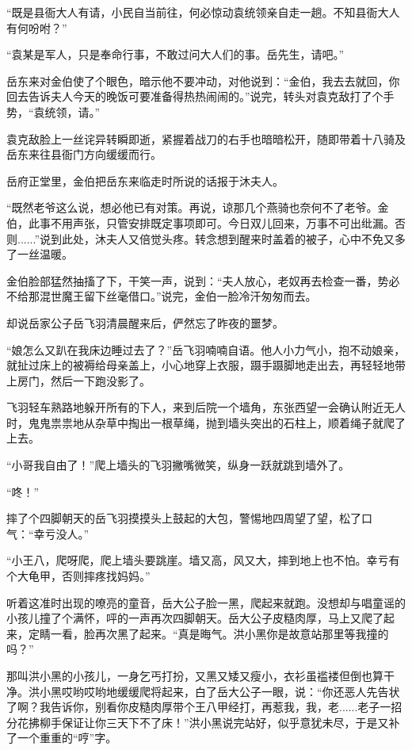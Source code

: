 “既是县衙大人有请，小民自当前往，何必惊动袁统领亲自走一趟。不知县衙大人有何吩咐？”

“袁某是军人，只是奉命行事，不敢过问大人们的事。岳先生，请吧。”

岳东来对金伯使了个眼色，暗示他不要冲动，对他说到：“金伯，我去去就回，你回去告诉夫人今天的晚饭可要准备得热热闹闹的。”说完，转头对袁克敌打了个手势，“袁统领，请。”

袁克敌脸上一丝诧异转瞬即逝，紧握着战刀的右手也暗暗松开，随即带着十八骑及岳东来往县衙门方向缓缓而行。

\splitline

岳府正堂里，金伯把岳东来临走时所说的话报于沐夫人。

“既然老爷这么说，想必他已有对策。再说，谅那几个燕骑也奈何不了老爷。金伯，此事不用声张，只管安排既定事项即可。今日双儿回来，万事不可出纰漏。否则......”说到此处，沐夫人又倍觉头疼。转念想到醒来时盖着的被子，心中不免又多了一丝温暖。

金伯脸部猛然抽搐了下，干笑一声，说到：“夫人放心，老奴再去检查一番，势必不给那混世魔王留下丝毫借口。”说完，金伯一脸冷汗匆匆而去。

\splitline

却说岳家公子岳飞羽清晨醒来后，俨然忘了昨夜的噩梦。

“娘怎么又趴在我床边睡过去了？”岳飞羽喃喃自语。他人小力气小，抱不动娘亲，就扯过床上的被褥给母亲盖上，小心地穿上衣服，蹑手蹑脚地走出去，再轻轻地带上房门，然后一下跑没影了。

飞羽轻车熟路地躲开所有的下人，来到后院一个墙角，东张西望一会确认附近无人时，鬼鬼祟祟地从杂草中掏出一根草绳，抛到墙头突出的石柱上，顺着绳子就爬了上去。

“小哥我自由了！”爬上墙头的飞羽撇嘴微笑，纵身一跃就跳到墙外了。

“咚！”

摔了个四脚朝天的岳飞羽摸摸头上鼓起的大包，警惕地四周望了望，松了口气：“幸亏没人。”

“小王八，爬呀爬，爬上墙头要跳崖。墙又高，风又大，摔到地上也不怕。幸亏有个大龟甲，否则摔疼找妈妈。”

听着这准时出现的嘹亮的童音，岳大公子脸一黑，爬起来就跑。没想却与唱童谣的小孩儿撞了个满怀，呯的一声再次四脚朝天。岳大公子皮糙肉厚，马上又爬了起来，定睛一看，脸再次黑了起来。“真是晦气。洪小黑你是故意站那里等我撞的吗？”

那叫洪小黑的小孩儿，一身乞丐打扮，又黑又矮又瘦小，衣衫虽褴褛但倒也算干净。洪小黑哎哟哎哟地缓缓爬将起来，白了岳大公子一眼，说：“你还恶人先告状了啊？我告诉你，别看你皮糙肉厚带个王八甲经打，再惹我，我，老......老子一招分花拂柳手保证让你三天下不了床！”洪小黑说完站好，似乎意犹未尽，于是又补了一个重重的“哼”字。

